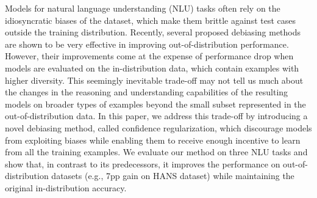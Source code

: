 Models for natural language understanding (NLU) tasks often rely on the idiosyncratic biases of the dataset, which make them brittle against test cases outside the training distribution. Recently, several proposed debiasing methods are shown to be very effective in improving out-of-distribution performance. However, their improvements come at the expense of performance drop when models are evaluated on the in-distribution data, which contain examples with higher diversity. This seemingly inevitable trade-off may not tell us much about the changes in the reasoning and understanding capabilities of the resulting models on broader types of examples beyond the small subset represented in the out-of-distribution data. In this paper, we address this trade-off by introducing a novel debiasing method, called confidence regularization, which discourage models from exploiting biases while enabling them to receive enough incentive to learn from all the training examples. We evaluate our method on three NLU tasks and show that, in contrast to its predecessors, it improves the performance on out-of-distribution datasets (e.g., 7pp gain on HANS dataset) while maintaining the original in-distribution accuracy.

